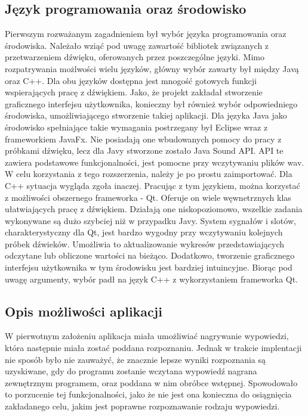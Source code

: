 \documentclass[a4paper,12 pt]{article}
\begin{document}
\subsection{Język programowania oraz środowisko}
Pierwszym rozważanym zagadnieniem był wybór języka programowania oraz środowiska. Należało wziąć pod uwagę zawartość bibliotek związanych z przetwarzeniem dźwięku, oferowanych przez poszczególne języki.
Mimo rozpatrywania możlwości wielu języków, główny wybór zawarty był między Javą oraz C++. Dla obu języków dostępna jest mnogość gotowych funkcji wspierających pracę z dźwiękiem. Jako, że projekt zakładał stworzenie graficznego interfejsu użytkownika, 
konieczny był również wybór odpowiedniego środowiska, umożliwiającego stworzenie takiej aplikacji. Dla języka Java jako środowisko spełniające takie wymagania postrzegany był Eclipse wraz z frameworkiem JavaFx. Nie posiadają one wbudowanych pomocy do pracy z próbkami dźwięku, lecz dla Javy stworzone zostało
Java Sound API. API te zawiera podstawowe funkcjonalności, jest pomocne przy wczytywaniu plików wav. W celu korzystania z tego rozszerzenia, należy je po prostu zaimportować. Dla  C++ sytuacja wygląda zgoła inaczej. Pracując z tym językiem, można korzystać z możliwości obszernego frameworka - Qt. Oferuje on wiele węwnetrznych klas ułatwiających pracę z dźwiękiem. Działają one niskopoziomowo, wszelkie zadania wykonywane są dużo szybciej niż w przypadku Javy.  System sygnałów i slotów, charakterystyczny dla Qt, jest bardzo wygodny przy wczytywaniu kolejnych próbek dźwieków. Umożliwia to aktualizowanie wykresów przedstawiających odczytane lub obliczone wartości na bieżąco. Dodatkowo, tworzenie graficznego interfejsu użytkownika w tym środowisku jest bardziej intuincyjne. Biorąc pod uwagę argumenty, wybór padł na język C++ z wykorzystaniem frameworka Qt.

\subsection{Opis możliwości aplikacji}
W pierwotnym założeniu aplikacja miała umożliwiać nagrywanie wypowiedzi, która następnie miała zostać poddana rozpoznaniu. Jednak w trakcie implentacji nie sposób było nie zauważyć, że znacznie lepsze wyniki rozpoznania są uzyskiwane, gdy do programu zostanie wczytana wypowiedź nagrana zewnętrznym programem, oraz poddana w nim obróbce wstępnej. Spowodowało to porzucenie tej funkcjonalności, jako że nie jest ona konieczna do osiągnięcia zakładanego celu, jakim jest poprawne rozpoznawanie rodzaju wypowiedzi.
\end{document}
